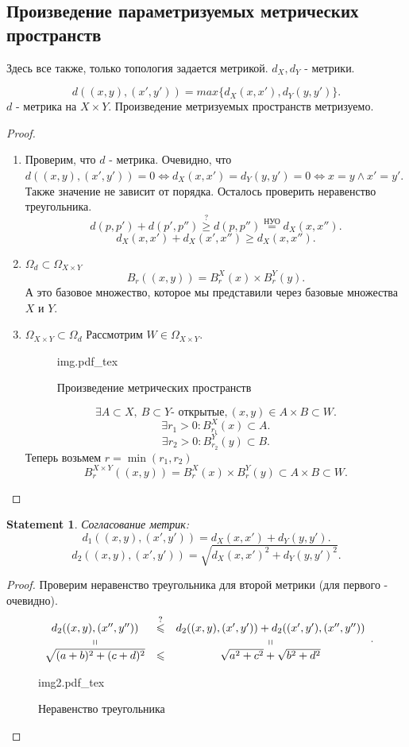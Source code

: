 \documentclass[11pt]{book}
\newcommand{\incfig}[1]{%
    \def\svgwidth{\columnwidth}
    {#1.pdf_tex}
}
\renewcommand{\le}{\leqslant}
\renewcommand{\ge}{\geqslant}
\theoremstyle{definition}
\theoremstyle{plain}
\theoremstyle{plain}
\newtheorem*{st}{Statement}
\theoremstyle{definition}
\theoremstyle{remark}
\begin{document}
\subsection{Произведение параметризуемых метрических пространств}
Здесь все также, только топология задается метрикой.
$d_X, d_Y$ - метрики.
\begin{thm}
    \[
	d((x, y) , (x', y')) = max \{d_X(x, x'), d_Y(y, y')\}
    .\]
    $d$ - метрика на $X \times Y$.
    Произведение метризуемых пространств метризуемо.
\end{thm}
\begin{proof}
    \begin{enumerate}
	\item
	    Проверим, что $d$ - метрика.
	    Очевидно, что $d((x, y), (x', y')) = 0 \Longleftrightarrow d_X(x, x') = d_Y(y, y') = 0 \Longleftrightarrow x = y \wedge x' = y'$. Также значение не зависит от порядка. Осталось проверить неравенство треугольника.
	    \[
		d(p, p') + d(p', p'') \stackrel{?}\ge  d(p, p'') \stackrel{\text{НУО}} = d_X(x, x'')
	    .\]
	    \[
		d_X(x, x') + d_X(x', x'') \ge d_X(x, x'')
	    .\]
	\item $\Omega_d \subset \Omega _{X \times Y} $
	    \[
		B_r((x, y)) = B_r^X(x) \times B_r^Y(y)
	    .\]
	    А  это базовое множество, которое мы представили через базовые множества $X$ и $Y$.

	\item $\Omega _{X \times Y} \subset \Omega_d$
	    Рассмотрим  $W \in \Omega _{X \times Y}$.
	    \begin{figure}[ht]
		\centering
		\incfig{img}
		\caption{Произведение метрических пространств}
		\label{fig:img}
	    \end{figure}
	    \[
		\exists A \subset X, ~ B \subset Y \mbox{- открытые}, (x, y) \in  A\times B \subset W
	    .\]
	    \[
		\exists r_1 > 0: B_{r_1}^X(x) \subset A
	    .\]
	    \[
		\exists r_2 > 0: B_{r_2}^Y(y) \subset B
	    .\]
	    Теперь возьмем $r = \min (r_1, r_2)$
	    \[
		B_r^{X \times Y} ((x, y)) = B_r^X(x) \times B_r^Y(y) \subset A \times B \subset W
	    .\]
    \end{enumerate}
\end{proof}
\begin{st}
    Согласование метрик:
    \[
	d_1 ((x, y), (x', y')) = d_X(x, x') + d_Y(y, y')
    .\]
    \[
	d_2((x, y), (x', y')) = \sqrt{d_X(x, x')^2 + d_Y (y, y')^2}
    .\]
\end{st}
\begin{proof}
    Проверим неравенство треугольника для второй метрики (для первого - очевидно).
    \[
	\begin{array}{ccc}
	    d_2((x, y), (x'', y'')) &\stackrel{?}\le & d_2((x, y), (x', y')) + d_2((x', y'), (x'', y'')) \\
	    \shortparallel & & \shortparallel \\
	    \sqrt{(a + b)^2 + (c+d)^2} & \le & \sqrt {a^2+c^2} + \sqrt {b^2+d^2}
	\end{array}
    .\]
    \begin{figure}[ht]
	\centering
	\incfig{img2}
	\caption{Неравенство треугольника}
	\label{fig:img2}
    \end{figure}
\end{proof}
\end{document}
